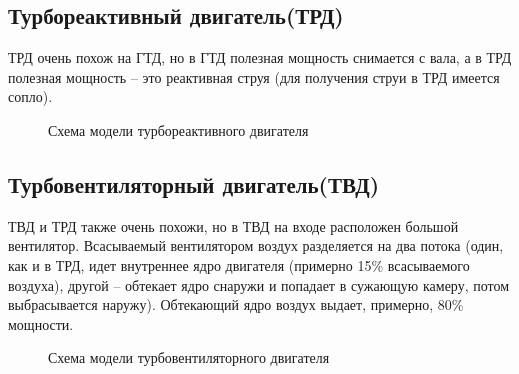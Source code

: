 \documentclass[a4paper,14pt]{article}
\begin{document}
    \subsection{Турбореактивный двигатель(ТРД)}
        ТРД очень похож на ГТД, но в ГТД полезная мощность снимается с вала, а в ТРД полезная мощность -- это реактивная струя (для получения струи в ТРД имеется сопло).
        \begin{figure}[h]
            \caption{Схема модели турбореактивного двигателя}
        \end{figure}
    \subsection{Турбовентиляторный двигатель(ТВД)}
        ТВД и ТРД также очень похожи, но в ТВД на входе расположен большой вентилятор. Всасываемый вентилятором воздух разделяется на два потока (один, как и в ТРД, идет внутреннее ядро двигателя (примерно 15\% всасываемого воздуха), другой -- обтекает ядро снаружи и попадает в сужающую камеру, потом выбрасывается наружу). Обтекающий ядро воздух выдает, примерно, 80\% мощности.
        \begin{figure}[h]
            \caption{Схема модели турбовентиляторного двигателя}
        \end{figure}
    \pagebreak
\end{document}
